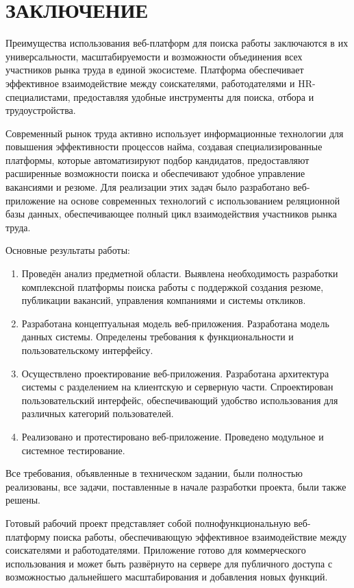 \section*{ЗАКЛЮЧЕНИЕ}

Преимущества использования веб-платформ для поиска работы заключаются в их универсальности, масштабируемости и возможности объединения всех участников рынка труда в единой экосистеме. Платформа обеспечивает эффективное взаимодействие между соискателями, работодателями и HR-специалистами, предоставляя удобные инструменты для поиска, отбора и трудоустройства. 
  
Современный рынок труда активно использует информационные технологии для повышения эффективности процессов найма, создавая специализированные платформы, которые автоматизируют подбор кандидатов, предоставляют расширенные возможности поиска и обеспечивают удобное управление вакансиями и резюме. Для реализации этих задач было разработано веб-приложение на основе современных технологий с использованием реляционной базы данных, обеспечивающее полный цикл взаимодействия участников рынка труда.

Основные результаты работы:

\begin{enumerate}
\item Проведён анализ предметной области. Выявлена необходимость разработки комплексной платформы поиска работы с поддержкой создания резюме, публикации вакансий, управления компаниями и системы откликов.
\item Разработана концептуальная модель веб-приложения. Разработана модель данных системы. Определены требования к функциональности и пользовательскому интерфейсу.
\item Осуществлено проектирование веб-приложения. Разработана архитектура системы с разделением на клиентскую и серверную части. Спроектирован пользовательский интерфейс, обеспечивающий удобство использования для различных категорий пользователей.
\item Реализовано и протестировано веб-приложение. Проведено модульное и системное тестирование.
\end{enumerate}

Все требования, объявленные в техническом задании, были полностью реализованы, все задачи, поставленные в начале разработки проекта, были также решены.

Готовый рабочий проект представляет собой полнофункциональную веб-платформу поиска работы, обеспечивающую эффективное взаимодействие между соискателями и работодателями. Приложение готово для коммерческого использования и может быть развёрнуто на сервере для публичного доступа с возможностью дальнейшего масштабирования и добавления новых функций.
